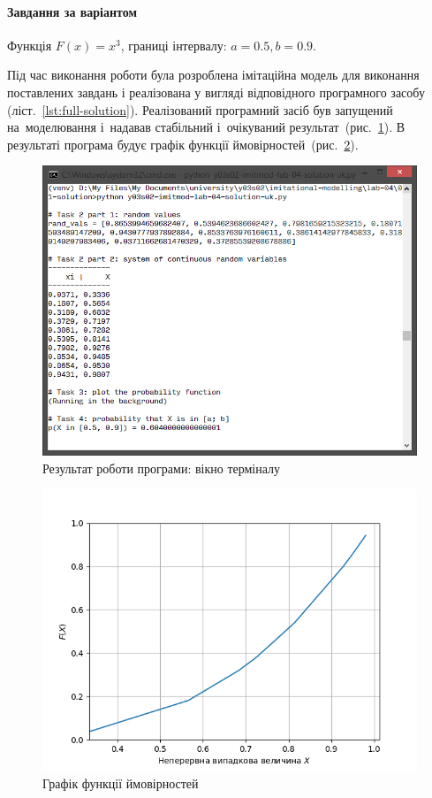 \documentclass[
	a4paper,
	oneside,
	BCOR = 10mm,
	DIV = 12,
	12pt,
	headings = normal,
]{scrartcl}
\begin{document}
		\paragraph{Завдання за варіантом} Функція $F(x) = x^3$, границі інтервалу: $a = \num{0.5}, b = \num{0.9}$.

		Під час виконання роботи була розроблена імітаційна модель для виконання поставлених завдань і реалізована у вигляді відповідного програмного засобу (ліст.~\ref{lst:full-solution}). Реалізований програмний засіб був запущений на~моделювання і~надавав стабільний і~очікуваний результат~(рис.~\ref{fig:program_scr}). В результаті програма будує графік функції ймовірностей~(рис.~\ref{fig:pmf}).

		\begin{figure}[!htbp]
			\centering
			\includegraphics[height = 10\baselineskip]{./assets/y03s02-imitmod-lab-04-p00.png}
			\caption{Результат роботи програми: вікно терміналу}
			\label{fig:program_scr}
		\end{figure}
		
		\begin{figure}[!htbp]
			\centering
			\includegraphics[height = 14\baselineskip]{./assets/y03s02-imitmod-lab-04-p01.png}
			\caption{Графік функції ймовірностей}
			\label{fig:pmf}
		\end{figure}
\end{document}
